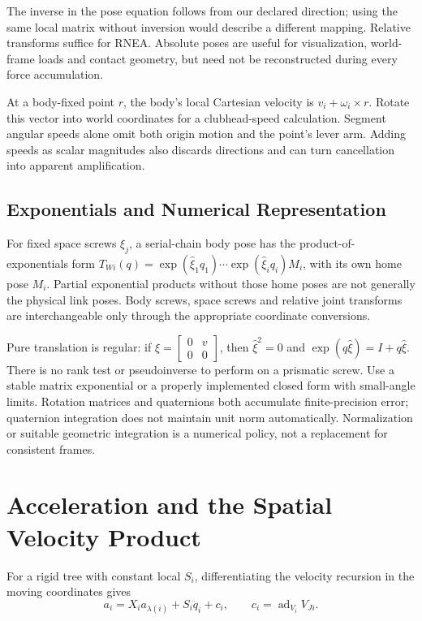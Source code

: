 The inverse in the pose equation follows from our declared direction; using the same local matrix without inversion would describe a different mapping. Relative transforms suffice for RNEA. Absolute poses are useful for visualization, world-frame loads and contact geometry, but need not be reconstructed during every force accumulation.

At a body-fixed point $r$, the body's local Cartesian velocity is $v_i+\omega_i\times r$. Rotate this vector into world coordinates for a clubhead-speed calculation. Segment angular speeds alone omit both origin motion and the point's lever arm. Adding speeds as scalar magnitudes also discards directions and can turn cancellation into apparent amplification.

\subsection{Exponentials and Numerical Representation}

For fixed space screws $\xi_j$, a serial-chain body pose has the product-of-exponentials form $T_{Wi}(q)=\exp(\widehat\xi_1q_1)\cdots\exp(\widehat\xi_iq_i)M_i$, with its own home pose $M_i$. Partial exponential products without those home poses are not generally the physical link poses. Body screws, space screws and relative joint transforms are interchangeable only through the appropriate coordinate conversions.

Pure translation is regular: if $\widehat\xi=\left[\begin{smallmatrix}0&v\\0&0\end{smallmatrix}\right]$, then $\widehat\xi^2=0$ and $\exp(q\widehat\xi)=I+q\widehat\xi$. There is no rank test or pseudoinverse to perform on a prismatic screw. Use a stable matrix exponential or a properly implemented closed form with small-angle limits. Rotation matrices and quaternions both accumulate finite-precision error; quaternion integration does not maintain unit norm automatically. Normalization or suitable geometric integration is a numerical policy, not a replacement for consistent frames.

\section{Acceleration and the Spatial Velocity Product}
\label{sec:spatial_acceleration}

For a rigid tree with constant local $S_i$, differentiating the velocity recursion in the moving coordinates gives
\begin{equation}
 a_i=X_i a_{\lambda(i)}+S_i\ddot q_i+c_i,
 \qquad c_i=\operatorname{ad}_{V_i}V_{Ji}.
 \label{eq:acceleration_recursion}
\end{equation}


